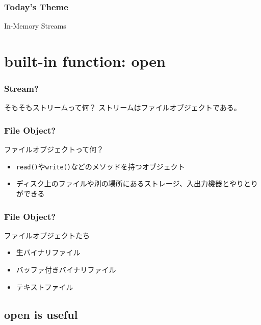 \documentclass[dvipdfmx,12pt,notheorems]{beamer}
\theoremstyle{definition}
\begin{document}
\begin{frame}\frametitle{Today's Theme}
\begin{center}
\huge{In-Memory Streams}
\end{center}
\end{frame}

\section{built-in function: open}

\begin{frame}\frametitle{Stream?}

\begin{block}{そもそもストリームって何？}
ストリームはファイルオブジェクトである。
\end{block}

\end{frame}

\begin{frame}\frametitle{File Object?}

\begin{block}{ファイルオブジェクトって何？}
\begin{itemize}
\item \texttt{read()}や\texttt{write()}などのメソッドを持つオブジェクト
\item ディスク上のファイルや別の場所にあるストレージ、入出力機器とやりとりができる
\end{itemize}
\end{block}

\end{frame}

\begin{frame}\frametitle{File Object?}

\begin{block}{ファイルオブジェクトたち}
\begin{itemize}
\item 生バイナリファイル
\item バッファ付きバイナリファイル
\item テキストファイル
\end{itemize}
\end{block}

\end{frame}

\subsection{open is useful}
\end{document}
